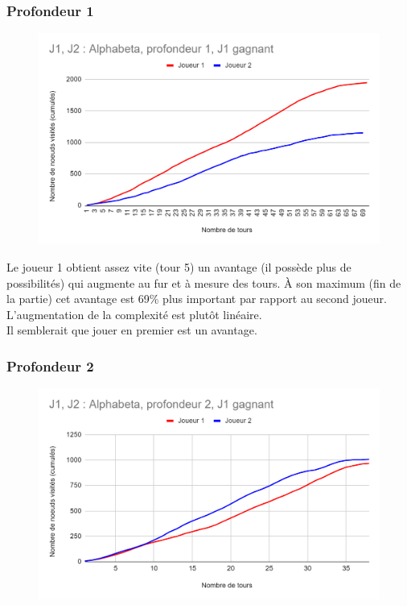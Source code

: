 \documentclass[12pt]{article}
\begin{document}
\subsubsection{Profondeur 1}

\begin{figure}[!h]
   \includegraphics[width=\textwidth]{prof1alphabeta.png}
\end{figure}

Le joueur 1 obtient assez vite (tour 5) un avantage (il possède plus de possibilités) qui augmente au fur et à mesure des tours. À son maximum (fin de la partie) cet avantage est 69\% plus important par rapport au second joueur.\\
L’augmentation de la complexité est plutôt linéaire.\\
Il semblerait que jouer en premier est un avantage.
\newpage
\subsubsection{Profondeur 2}

\begin{figure}[!h]
   \includegraphics[width=\textwidth]{prof2alphabeta.png}
\end{figure}
\end{document}
